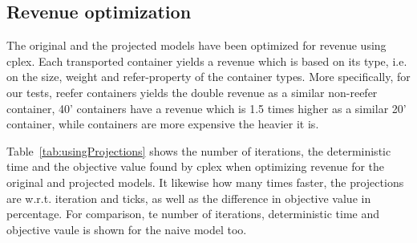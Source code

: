 \subsection{Revenue optimization}
The original and the projected models have been optimized for revenue using cplex. Each transported container yields a revenue which is based on its type, i.e. on the size, weight and refer-property of the container types. More specifically, for our tests, reefer containers yields the double revenue as a similar non-reefer container, 40' containers have a revenue which is 1.5 times higher as a similar 20' container, while containers are more expensive the heavier it is.    

Table~\ref{tab:usingProjections} shows the number of iterations, the deterministic time and the objective value found by cplex when optimizing revenue for the original and projected models. It likewise how many times faster, the projections are w.r.t. iteration and ticks, as well as the difference in objective value in percentage. For comparison, te number of iterations, deterministic time and objective vaule is shown for the naive model too. 

